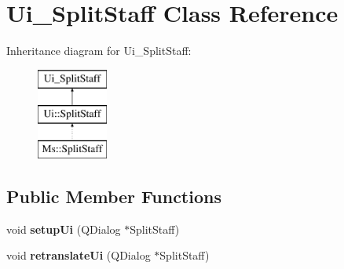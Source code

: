 \hypertarget{class_ui___split_staff}{}\section{Ui\+\_\+\+Split\+Staff Class Reference}
\label{class_ui___split_staff}
Inheritance diagram for Ui\+\_\+\+Split\+Staff\+:\begin{figure}[H]
\begin{center}
\leavevmode
\includegraphics[height=3.000000cm]{class_ui___split_staff}
\end{center}
\end{figure}
\subsection*{Public Member Functions}
\begin{DoxyCompactItemize}
\item 
\mbox{\label{class_ui___split_staff_a3983d381a9c3b43e6f33d5aae56ee545}} 
void {\bfseries setup\+Ui} (Q\+Dialog $\ast$Split\+Staff)
\item 
\mbox{\label{class_ui___split_staff_aa53aae627ee8b2d09a3f5d3eb4c0c49d}} 
void {\bfseries retranslate\+Ui} (Q\+Dialog $\ast$Split\+Staff)
\end{DoxyCompactItemize}
